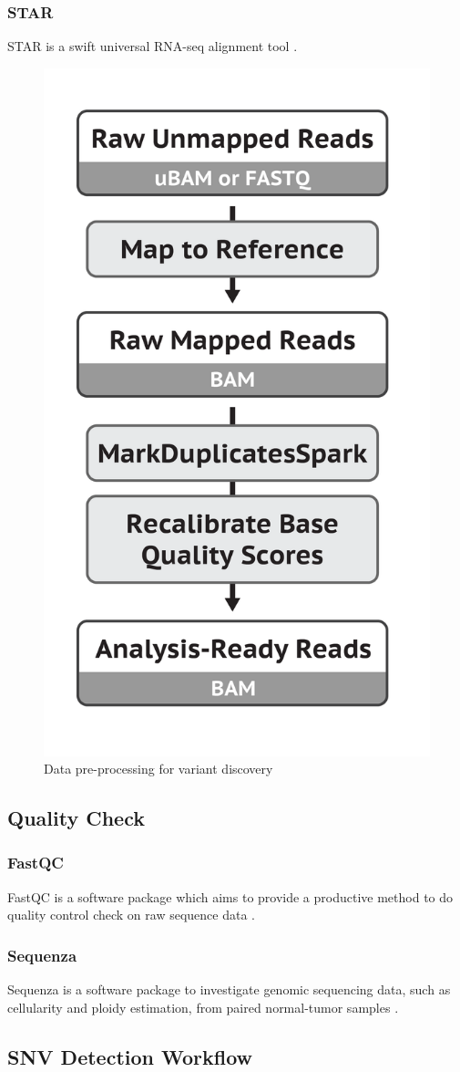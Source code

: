 \documentclass[a4paper]{article}
\begin{document}
            \subsubsection{STAR}
                STAR is a swift universal RNA-seq alignment tool \cite{star1}.

            \begin{figure}[p]
                \centering
                \includegraphics[width=0.2 \linewidth]{figures/Workflow/mapping.png}
                \caption{Data pre-processing for variant discovery \protect\cite{gatk1, gatk2}}
            \end{figure}

        \subsection{Quality Check}
            \subsubsection{FastQC}
                FastQC is a software package which aims to provide a productive method to do quality control check on raw sequence data \cite{fastqc1}.

            \subsubsection{Sequenza}
                Sequenza is a software package to investigate genomic sequencing data, such as cellularity and ploidy estimation, from paired normal-tumor samples \cite{sequenza1}.

        \subsection{SNV Detection Workflow}
\end{document}
